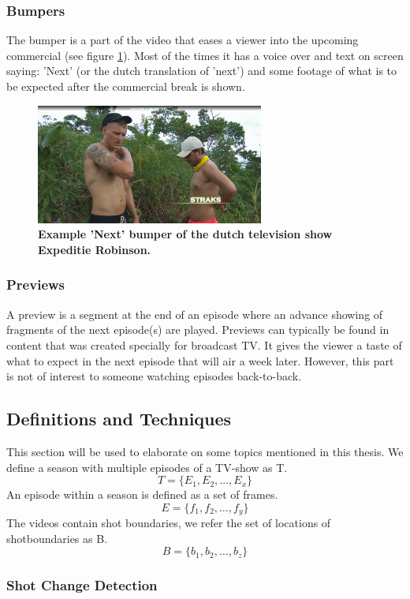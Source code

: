 \documentclass{article}
\begin{document}
\subsubsection{Bumpers}
The bumper is a part of the video that eases a viewer into the upcoming commercial (see figure \ref{examplebumper}). Most of the times it has a voice over and text on screen saying: 'Next' (or the dutch translation of 'next') and some footage of what is to be expected after the commercial break is shown.

\begin{figure}[H]
    \includegraphics[width=7.5cm]{images/straks.png}
    \centering
    \caption{\textbf{Example 'Next' bumper of the dutch television show Expeditie Robinson.}}
    \label{examplebumper}
\end{figure}

\subsubsection{Previews}
A preview is a segment at the end of an episode where an advance showing of fragments of the next episode(s) are played. Previews can typically be found in content that was created specially for broadcast TV. It gives the viewer a taste of what to expect in the next episode that will air a week later. However, this part is not of interest to someone watching episodes back-to-back.

\subsection{Definitions and Techniques}
This section will be used to elaborate on some topics mentioned in this thesis. We define a season with multiple episodes of a TV-show as T.
\[T = \{E_1, E_2, \dots, E_x\}\]
An episode within a season is defined as a set of frames.
\[E = \{f_1, f_2, \dots, f_y\}\]
The videos contain shot boundaries, we refer the set of locations of shotboundaries as B.
\[B = \{b_1, b_2, \dots, b_z\}\]

\subsubsection{Shot Change Detection}
\end{document}

